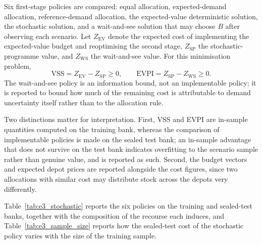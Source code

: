 \documentclass[authoryear,final,3p,times]{elsarticle}
\theoremstyle{definition}
\theoremstyle{plain}
\begin{document}
Six first-stage policies are compared: equal allocation, expected-demand
allocation, reference-demand allocation, the expected-value deterministic
solution, the stochastic solution, and a wait-and-see solution that may choose
$B$ after observing each scenario.  Let $Z_{\mathrm{EV}}$ denote the expected
cost of implementing the expected-value budget and reoptimising the second
stage, $Z_{\mathrm{SP}}$ the stochastic-programme value, and
$Z_{\mathrm{WS}}$ the wait-and-see value.  For this minimisation problem,
\begin{equation}
 \mathrm{VSS}=Z_{\mathrm{EV}}-Z_{\mathrm{SP}}\ge0,
 \qquad
 \mathrm{EVPI}=Z_{\mathrm{SP}}-Z_{\mathrm{WS}}\ge0.
 \label{eq:vss_evpi}
\end{equation}
The wait-and-see policy is an information bound, not an implementable policy;
it is reported to bound how much of the remaining cost is attributable to
demand uncertainty itself rather than to the allocation rule.

Two distinctions matter for interpretation.  First, VSS and EVPI are
in-sample quantities computed on the training bank, whereas the comparison of
implementable policies is made on the sealed test bank; an in-sample advantage
that does not survive on the test bank indicates overfitting to the scenario
sample rather than genuine value, and is reported as such.  Second, the
budget vectors and expected depot prices are reported alongside the cost
figures, since two allocations with similar cost may distribute stock across
the depots very differently.

Table~\ref{tab:e3_stochastic} reports the six policies on the training and
sealed-test banks, together with the composition of the recourse each induces,
and Table~\ref{tab:e3_sample_size} reports how the sealed-test cost of the
stochastic policy varies with the size of the training sample.

\begin{table}[!htbp]
\centering
\caption{First-stage allocation policies: in-sample and sealed-test performance.}
\label{tab:e3_stochastic}
\end{table}
\end{document}
